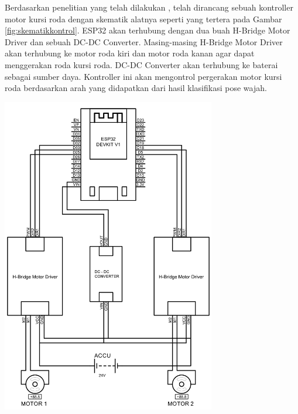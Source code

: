 Berdasarkan penelitian yang telah dilakukan \parencite{ekatama2024perancangan}, telah dirancang sebuah kontroller motor kursi roda dengan skematik alatnya seperti yang tertera pada Gambar \ref{fig:skematikkontrol}. ESP32 akan terhubung dengan dua buah H-Bridge Motor Driver dan sebuah DC-DC Converter. Masing-masing H-Bridge Motor Driver akan terhubung ke motor roda kiri dan motor roda kanan agar dapat menggerakan roda kursi roda. DC-DC Converter akan terhubung ke baterai sebagai sumber daya. Kontroller ini akan mengontrol pergerakan motor kursi roda berdasarkan arah yang didapatkan dari hasil klasifikasi pose wajah. 

\begin{center}
  \centering
  \includegraphics[width=0.7\textwidth]{gambar/Schematics.png}
  \label{fig:skematikkontrol}
\end{center}

